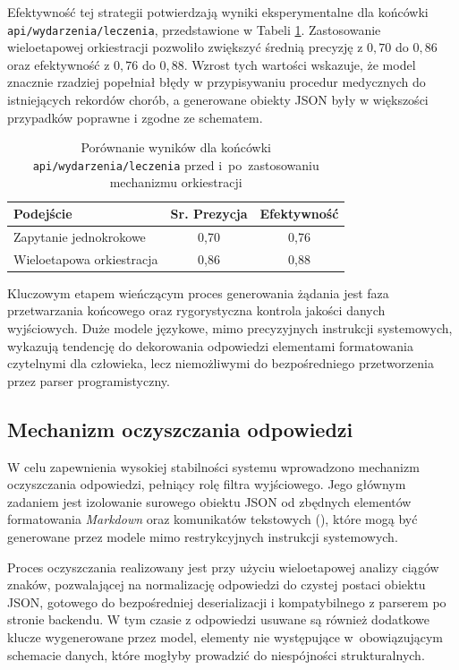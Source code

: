 Efektywność tej strategii potwierdzają wyniki eksperymentalne dla końcówki \texttt{api/wydarzenia/\allowbreak{}leczenia}, przedstawione w Tabeli \ref{tab:wyniki_leczenia}. Zastosowanie wieloetapowej orkiestracji pozwoliło zwiększyć średnią precyzję z $0{,}70$ do $0{,}86$ oraz efektywność z $0{,}76$ do $0{,}88$. Wzrost tych wartości wskazuje, że model znacznie rzadziej popełniał błędy w przypisywaniu procedur medycznych do istniejących rekordów chorób, a generowane obiekty JSON były w większości przypadków poprawne i zgodne ze schematem.

\begin{table}[h!]
\centering
	\caption{Porównanie wyników dla końcówki \texttt{api/\allowbreak{}wydarzenia/\allowbreak{}leczenia} przed i~po~zastosowaniu mechanizmu orkiestracji}
\label{tab:wyniki_leczenia}
\begin{tabular}{|l|c|c|}
\hline
\textbf{Podejście} & \textbf{Sr. Prezycja} & \textbf{Efektywność} \\ \hline
Zapytanie jednokrokowe & 0,70 & 0,76 \\ \hline
Wieloetapowa orkiestracja & 0,86 & 0,88 \\ \hline
\end{tabular}
\end{table}

Kluczowym etapem wieńczącym proces generowania żądania jest faza przetwarzania końcowego oraz rygorystyczna kontrola jakości danych wyjściowych. Duże modele językowe, mimo precyzyjnych instrukcji systemowych, wykazują tendencję do dekorowania odpowiedzi elementami formatowania czytelnymi dla człowieka, lecz niemożliwymi do bezpośredniego przetworzenia przez parser programistyczny.

\subsection{Mechanizm oczyszczania odpowiedzi}

W celu zapewnienia wysokiej stabilności systemu wprowadzono mechanizm oczyszczania odpowiedzi, pełniący rolę filtra wyjściowego. Jego głównym zadaniem jest izolowanie surowego obiektu JSON od zbędnych elementów formatowania \textit{Markdown} oraz komunikatów tekstowych (), które mogą być generowane przez modele  mimo restrykcyjnych instrukcji systemowych.  

Proces oczyszczania realizowany jest przy użyciu wieloetapowej analizy ciągów znaków, pozwalającej na normalizację odpowiedzi do czystej postaci obiektu JSON, gotowego do bezpośredniej deserializacji i kompatybilnego z parserem po stronie backendu. W tym czasie z odpowiedzi usuwane są również dodatkowe klucze wygenerowane przez model, elementy nie występujące w~obowiązującym schemacie danych, które mogłyby prowadzić do niespójności strukturalnych.

